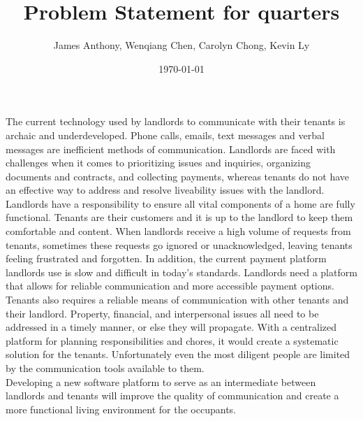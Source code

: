 \documentclass[12pt]{article}
\begin{document}
\title{Problem Statement for quarters} 
\author{James Anthony, Wenqiang Chen, Carolyn Chong, Kevin Ly}
\date{\today}
	
\maketitle

The current technology used by landlords to communicate with their tenants is 
archaic and underdeveloped. Phone calls, emails, text messages and verbal 
messages are inefficient methods of communication. Landlords are faced with 
challenges when it comes to prioritizing issues and inquiries, organizing 
documents and contracts, and collecting payments, whereas tenants do not have an 
effective way to address and resolve liveability issues with the landlord. \\

Landlords have a responsibility to ensure all vital components of a home are 
fully functional. Tenants are their customers and it is up to the landlord to 
keep them comfortable and content. When landlords receive a high volume of 
requests from tenants, sometimes these requests go ignored or unacknowledged, 
leaving tenants feeling 
frustrated and forgotten. 
In addition, the current payment platform landlords use is slow and difficult 
in today's standards. 
Landlords need a platform that allows for reliable communication and more 
accessible payment options. \\

Tenants also requires a reliable means of communication with other tenants and their 
landlord. Property, financial, and interpersonal issues all need to be addressed 
in a timely manner, or else they will propagate. With a centralized 
platform for planning responsibilities and chores, it would create a systematic 
solution for the tenants. Unfortunately even the most diligent people are limited 
by the communication tools available to them. \\

Developing a new software platform to serve as an intermediate between 
landlords and tenants will improve the quality of communication 
and create a more functional living environment for the occupants.
\end{document}
